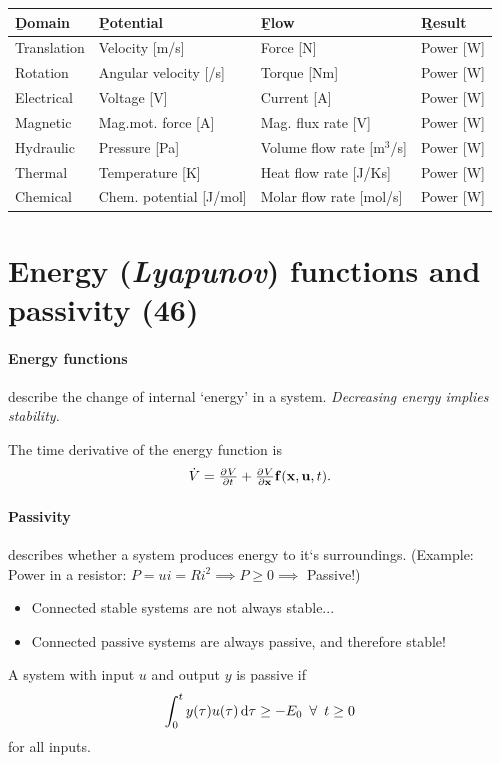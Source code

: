 \documentclass[a4paper, 12pt]{article}
\begin{document}
\begin{table}[H]
\small
\begin{tabular}{llll}
	\b{Domain}  & \b{Potential}           & \b{Flow}                                 & \b{Result} \\
	\hline
	Translation & Velocity [m/s]          & Force [N]                                & Power [W]  \\
	Rotation    & Angular velocity [/s]   & Torque [Nm]                              & Power [W]  \\
	Electrical  & Voltage [V]             & Current [A]                              & Power [W]  \\
	Magnetic    & Mag.mot. force [A]      & Mag. flux rate [V]                       & Power [W]  \\
	Hydraulic   & Pressure [Pa]           & Volume flow rate [m\(^3\)/s]             & Power [W]  \\
	Thermal     & Temperature [K]         & Heat flow rate [J/Ks]                    & Power [W]  \\
	Chemical    & Chem. potential [J/mol] & Molar flow rate [mol/s]                  & Power [W]
\end{tabular}
\end{table}

\section{Energy (\emph{Lyapunov}) functions and passivity (46)}
\paragraph{Energy functions} describe the change of internal `energy' in a system. \emph{Decreasing energy implies stability.}

The time derivative of the energy function is
\begin{equation}
	\dot{V} = \pd{V}{t} + \pd{V}{\V{x}} \V{f}(\V{x}, \V{u}, t).
\end{equation}

\paragraph{Passivity} describes whether a system produces energy to it`s surroundings.
(Example: Power in a resistor: \(P = u i = R i^2 \implies P \geq 0 \implies\) Passive!)
\begin{itemize}
	\item Connected stable systems are not always stable...
	\item Connected passive systems are always passive, and therefore stable!
\end{itemize}
A system with input \(u\) and output \(y\) is passive if
\begin{equation}
	\int_0^t y(\tau) u(\tau) \dif \tau \geq - E_0 \enforall t \geq 0
\end{equation}
for all inputs.
\end{document}
